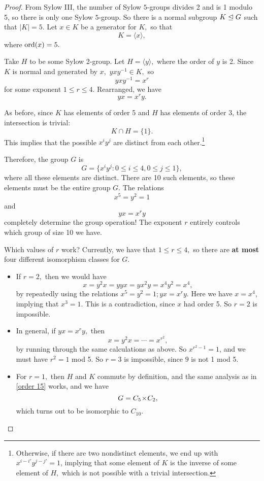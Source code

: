 \begin{proof}

From Sylow III, the number of Sylow $5$-groups divides 2 and is 1 modulo 5, so there is only one Sylow $5$-group. So there is a normal subgroup $K \trianglelefteq G$ such that $|K| = 5.$ Let $x \in K$ be a generator for $K,$ so that \[K = \langle x \rangle,\] where $\operatorname{ord}(x) = 5.$ 

Take $H$ to be some Sylow 2-group. Let $H = \langle y \rangle,$ where the order of $y$ is 2. Since $K$ is normal and generated by $x,$ $yxy^{-1}  \in K,$ so \[yxy^{-1} = x^r\]
for some exponent $1 \leq r \leq 4.$ Rearranged, we have \[yx = x^r y.\] 

As before, since $K$ has elements of order 5 and $H$ has elements of order 3, the intersection is trivial: \[K \cap H = \{1\}.\] This implies that the possible $x^iy^j$ are distinct from each other.\footnote{Otherwise, if there are two nondistinct elements, we end up with $x^{i-i'}y^{j-j'} = 1$, implying that some element of $K$ is the inverse of some element of $H,$ which is not possible with a trivial intersection.}

Therefore, the group $G$ is 
\[
G = \{x^i y^j: 0 \leq i \leq 4, 0 \leq j \leq 1\},
\]
where all these elements are distinct. There are 10 such elements, so these elements must be the entire group $G.$ The relations \[x^5 = y^2 = 1\] and \[yx = x^r y\] completely determine the group operation! The exponent $r$ entirely controls which group of size 10 we have. 

Which values of $r$ work? Currently, we have that $1 \leq r \leq 4,$ so there are \textbf{at most} four different isomorphism classes for $G.$ 

\begin{itemize}
    \item If $r = 2,$ then we would have \[x = y^2x = yyx = yx^2y = x^4y^2 = x^4,\] by repeatedly using the relations $x^5 = y^2 = 1; yx = x^r y$. Here we have $x = x^4$, implying that $x^3 = 1.$ This is a contradiction, since $x$ had order 5. So $r = 2$ is impossible.
    
    \item In general, if $yx = x^r y,$ then \[x = y^2x = \cdots = x^{r^2},\] by running through the same calculations as above. So $x^{r^2-1} = 1$, and we must have $r^2 = 1$ mod 5. So $r = 3$ is impossible, since $9$ is not 1 mod 5. 
    
    \item For $r = 1,$ then $H$ and $K$ commute by definition, and the same analysis as in \ref{order 15} works, and we have \[G = C_5 \hspace{0.05em}{\times}\hspace{0.05em} C_2,\] which turns out to be isomorphic to $C_{10}.$ 
    

\end{itemize}
\end{proof}
